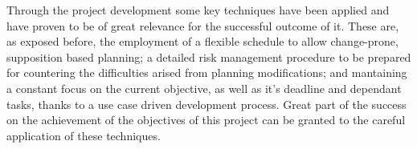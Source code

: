 		Through the project development some key techniques have been applied and have proven to be of great relevance for the successful outcome of it. These are, as exposed before, the employment of a flexible schedule to allow change-prone, supposition based planning; a detailed risk management procedure to be prepared for countering the difficulties arised from planning modifications; and mantaining a constant focus on the current objective, as well as it's deadline and dependant tasks, thanks to a use case driven development process. Great part of the success on the achievement of the objectives of this project can be granted to the careful application of these techniques.\\




